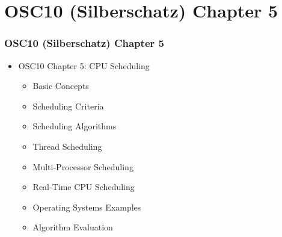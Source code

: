 \documentclass[aspectratio=169, xcolor=table, notheorems, hyperref={pdfpagelabels=false}]{beamer}
\begin{document}
\section{OSC10 (Silberschatz) Chapter 5}
\begin{frame}
\frametitle{OSC10 (Silberschatz) Chapter 5}
  \begin{itemize}
  \item OSC10 Chapter 5: CPU Scheduling
  \begin{itemize}
  \item Basic Concepts
  \item Scheduling Criteria
  \item Scheduling Algorithms
  \item Thread Scheduling
  \item Multi-Processor Scheduling
  \item Real-Time CPU Scheduling
  \item Operating Systems Examples
  \item Algorithm Evaluation
  \end{itemize}
  \end{itemize}
  \vfill \null
\end{frame}

\end{document}

